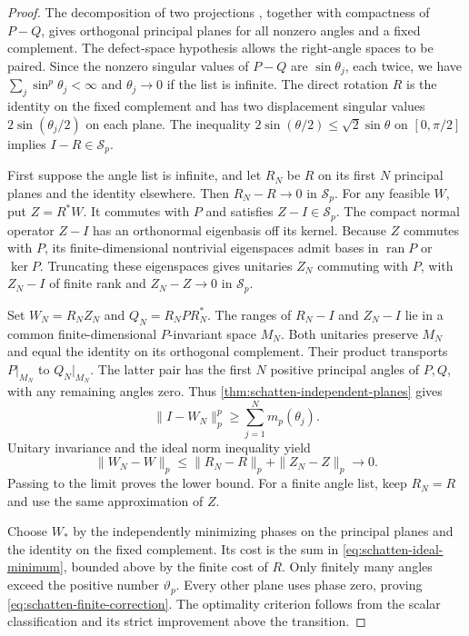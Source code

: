 \begin{proof}
The decomposition of two projections \citep{halmos1969two}, together with
compactness of $P-Q$, gives orthogonal principal planes for all nonzero
angles and a fixed complement. The defect-space hypothesis allows the
right-angle spaces to be paired. Since the nonzero singular values of
$P-Q$ are $\sin\theta_j$, each twice, we have
$\sum_j\sin^p\theta_j<\infty$ and $\theta_j\to0$ if the list is infinite.
The direct rotation $R$ is the identity on the fixed complement and has
two displacement singular values $2\sin(\theta_j/2)$ on each plane.
The inequality $2\sin(\theta/2)\leq\sqrt2\sin\theta$ on
$[0,\pi/2]$ implies $I-R\in\mathcal S_p$.

First suppose the angle list is infinite, and let $R_N$ be $R$ on its
first $N$ principal planes and the identity elsewhere. Then
$R_N-R\to0$ in $\mathcal S_p$. For any feasible $W$, put $Z=R^*W$.
It commutes with $P$ and satisfies $Z-I\in\mathcal S_p$. The compact
normal operator $Z-I$ has an orthonormal eigenbasis off its kernel.
Because $Z$ commutes with $P$, its finite-dimensional nontrivial
eigenspaces admit bases in $\operatorname{ran}P$ or $\ker P$.
Truncating these eigenspaces gives unitaries $Z_N$ commuting with $P$,
with $Z_N-I$ of finite rank and $Z_N-Z\to0$ in $\mathcal S_p$.

Set $W_N=R_N Z_N$ and $Q_N=R_N P R_N^*$. The ranges of $R_N-I$ and
$Z_N-I$ lie in a common finite-dimensional $P$-invariant space $M_N$.
Both unitaries preserve $M_N$ and equal the identity on its orthogonal
complement. Their product transports $P|_{M_N}$ to $Q_N|_{M_N}$.
The latter pair has the first $N$ positive principal angles of $P,Q$,
with any remaining angles zero. Thus
\cref{thm:schatten-independent-planes} gives
\[
 \|I-W_N\|_p^p\geq\sum_{j=1}^N m_p(\theta_j).
\]
Unitary invariance and the ideal norm inequality yield
\[
 \|W_N-W\|_p
  \leq\|R_N-R\|_p+\|Z_N-Z\|_p\longrightarrow0.
\]
Passing to the limit proves the lower bound. For a finite angle list,
keep $R_N=R$ and use the same approximation of $Z$.

Choose $W_*$ by the independently minimizing phases on the principal
planes and the identity on the fixed complement. Its cost is the sum
in \cref{eq:schatten-ideal-minimum}, bounded above by the finite cost of
$R$. Only finitely many angles exceed the positive number
$\vartheta_p$. Every other plane uses phase zero, proving
\cref{eq:schatten-finite-correction}. The optimality criterion follows
from the scalar classification and its strict improvement above the
transition.
\end{proof}
